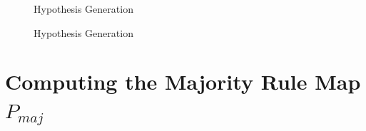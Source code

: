\documentclass[a4paper,10pt]{article}
\begin{document}
\begin{figure}[h]
\begin{center}
\caption{\label{fig:Hypothesis Generation}Hypothesis Generation}
\end{center}
\end{figure}


\begin{figure}[h]
\begin{center}
\caption{\label{fig:Hypothesis Generation}Hypothesis Generation}
\end{center}
\end{figure}

















\newpage

\section{Computing the Majority Rule Map $P_{maj}$}
\end{document}
